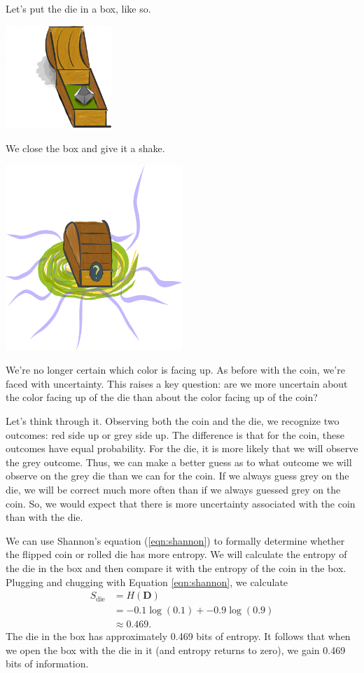 Let's put the die in a box, like so.
\begin{center}
\includegraphics[width=0.3\textwidth]{img/small-box-open-die}
\end{center}
We close the box and give it a shake.
\begin{center}
\includegraphics[width=0.5\textwidth]{img/small-box-closed-portal}
\end{center}
We're no longer certain which color is facing up.
As before with the coin, we're faced with uncertainty.
This raises a key question: are we more uncertain about the color facing up of the die than about the color facing up of the coin?

Let's think through it.
Observing both the coin and the die, we recognize two outcomes: red side up or grey side up.
The difference is that for the coin, these outcomes have equal probability.
For the die, it is more likely that we will observe the grey outcome.
Thus, we can make a better guess as to what outcome we will observe on the grey die than we can for the coin.
If we always guess grey on the die, we will be correct much more often than if we always guessed grey on the coin.
So, we would expect that there is more uncertainty associated with the coin than with the die.

We can use Shannon's equation (\ref{eqn:shannon}) to formally determine whether the flipped coin or rolled die has more entropy.
We will calculate the entropy of the die in the box and then compare it with the entropy of the coin in the box.
Plugging and chugging with Equation \ref{eqn:shannon}, we calculate
\begin{align*}
S_{\text{die}}
&= H(\bm{D}) \\
&= -0.1 \log(0.1) + -0.9 \log(0.9) \\
&\approx 0.469.
\end{align*}
The die in the box has approximately 0.469 bits of entropy.
It follows that when we open the box with the die in it (and entropy returns to zero), we gain 0.469 bits of information.
